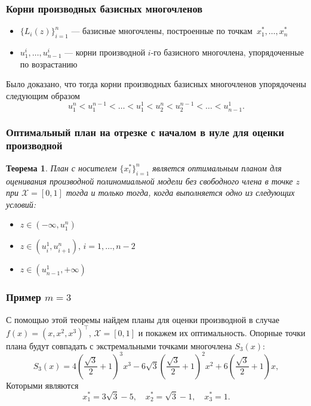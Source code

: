 \documentclass[unicode, notheorems, minimal, nologo]{beamer}
\newtheorem{theorem}{Теорема}
\begin{document}
\begin{frame}
	\frametitle{Корни производных базисных многочленов}
	
	\begin{itemize}
		\item $\{L_i(z)\}_{i=1}^n$ --- базисные многочлены, построенные по точкам~$x^*_1, \ldots, x^*_n$
		\item $u_1^i, \ldots, u_{n-1}^i$ --- корни производной $i$-го базисного многочлена, упорядоченные по возрастанию
	\end{itemize}
	Было доказано, что тогда корни производных базисных многочленов упорядочены следующим образом
	\begin{equation*}
		u^n_1 < u^{n-1}_1 < \ldots < u^1_1 < u^n_2 < u^{n-1}_2 < \ldots < u_{n-1}^1.
	\end{equation*}
	
	
\end{frame}

\begin{frame}
	\frametitle{Оптимальный план на отрезке с началом в нуле для оценки производной}
	
	\begin{theorem}
		План с носителем $\{x_i^*\}_{i=1}^n$ является оптимальным планом для оценивания производной полиномиальной модели без свободного члена в точке $z$ при $\mathcal{X} = [0, 1]$ тогда и только тогда, когда выполняется одно из следующих условий:
		\begin{itemize}
			\item $z \in (-\infty, u_1^n)$
			\item $z \in (u_i^1, u_{i+1}^n), \, i = 1, \ldots, n-2$
			\item $z \in (u_{n-1}^1, +\infty)$
		\end{itemize}
	\end{theorem}
\end{frame}

\begin{frame}
	\frametitle{Пример $m = 3$}
	С помощью этой теоремы найдем планы для оценки производной в случае $f(x) = (x, x^2, x^3)^\top$, $\mathcal{X} = [0, 1]$ и покажем их оптимальность. Опорные точки плана будут совпадать с экстремальными точками многочлена $S_3(x):$
	\begin{equation*}
		S_3(x) = 4 \left(\frac{\sqrt{3}}{2}+1\right)^3 x^3-6 \sqrt{3} \left(\frac{\sqrt{3}}{2}+1\right)^2 x^2+6 \left(\frac{\sqrt{3}}{2}+1\right) x,
	\end{equation*}
	Которыми являются
	\begin{equation*}
		x_1^* = 3 \sqrt{3} - 5, \quad x_2^* = \sqrt{3} - 1 , \quad x_3^* = 1.
	\end{equation*}
	
\end{frame}
\end{document}

